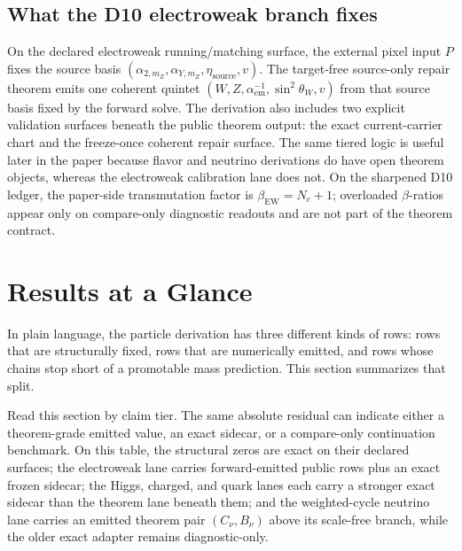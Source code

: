 \documentclass[11pt]{article}
\begin{document}
\subsection{What the D10 electroweak branch fixes}

On the declared electroweak running/matching surface, the external pixel input \(P\) fixes the
source basis
\((\alpha_{2,m_Z},\alpha_{Y,m_Z},\eta_{\mathrm{source}},v)\). The target-free
source-only repair theorem emits one coherent quintet
\((W,Z,\alpha_{\mathrm{em}}^{-1},\sin^2\theta_W,v)\) from that source basis fixed by the forward
solve. The
derivation also includes two explicit validation surfaces beneath the public theorem output: the
exact current-carrier chart and the freeze-once coherent repair surface. The same tiered logic is
useful later in the paper because flavor and neutrino derivations do have open theorem objects,
whereas the electroweak calibration lane does not.
On the sharpened D10 ledger, the paper-side transmutation factor is \(\beta_{\mathrm{EW}}=N_c+1\); overloaded \(\beta\)-ratios appear only on compare-only diagnostic readouts and are not part of the theorem contract.

\section{Results at a Glance}

In plain language, the particle derivation has three different kinds of rows: rows that are
structurally fixed, rows that are numerically emitted, and rows whose chains stop short of a promotable mass prediction. This section summarizes that split.

Read this section by claim tier. The same absolute residual can indicate either a theorem-grade emitted value, an exact sidecar, or a compare-only continuation benchmark. On this table, the structural zeros are exact on their declared surfaces; the electroweak lane carries forward-emitted public rows plus an exact frozen sidecar; the Higgs, charged, and quark lanes each carry a stronger exact sidecar than the theorem lane beneath them; and the weighted-cycle neutrino lane carries an emitted theorem pair \((C_\nu,B_\nu)\) above its scale-free branch, while the older exact adapter remains diagnostic-only.
\end{document}
